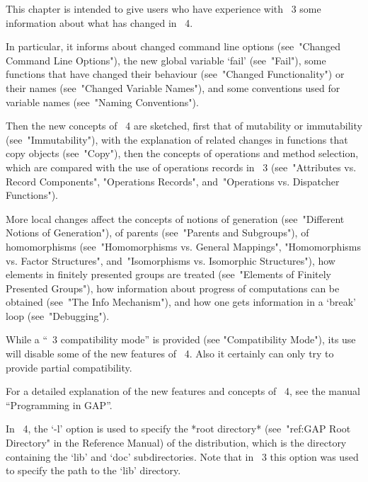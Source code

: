 

This chapter is intended to give users who have experience with {\GAP}~3
some information about what has changed in {\GAP}~4.

In particular, it informs about changed command line options
(see~"Changed Command Line Options"),
the new global variable `fail' (see~"Fail"),
some functions that have changed their behaviour
(see~"Changed Functionality") or their names
(see~"Changed Variable Names"),
and some conventions used for variable names (see~"Naming Conventions").

Then the new concepts of {\GAP}~4 are sketched,
first that of mutability or immutability (see~"Immutability"),
with the explanation of related changes in functions that copy objects
(see~"Copy"),
then the concepts of operations and method selection, which are compared
with the use of operations records in {\GAP}~3
(see~"Attributes vs. Record Components", "Operations Records",
and~"Operations vs. Dispatcher Functions").

More local changes affect the concepts of notions of generation
(see~"Different Notions of Generation"),
of parents (see~"Parents and Subgroups"),
of homomorphisms (see~"Homomorphisms vs. General Mappings",
"Homomorphisms vs. Factor Structures",
and~"Isomorphisms vs. Isomorphic Structures"),
how elements in finitely presented groups are treated
(see~"Elements of Finitely Presented Groups"),
how information about progress of computations can be obtained
(see~"The Info Mechanism"),
and how one gets information in a `break' loop
(see~"Debugging").

While a ``{\GAP}~3 compatibility mode'' is provided
(see "Compatibility Mode"),
its use will disable some of the new features of {\GAP}~4.
Also it certainly can only try to provide partial compatibility.

For a detailed explanation of the new features and concepts of {\GAP}~4,
see the manual ``Programming in GAP''.



In {\GAP}~4, the `-l' option is used to specify the *root directory*
(see~"ref:GAP Root Directory" in the Reference Manual)
of the {\GAP} distribution,
which is the directory containing the `lib' and `doc' subdirectories.
Note that in {\GAP}~3 this option was used to specify the path to the
`lib' directory.


